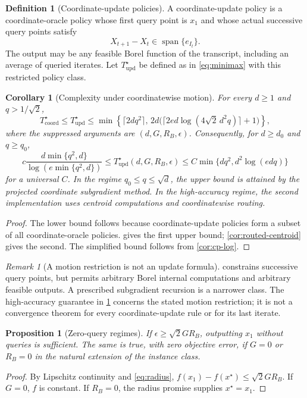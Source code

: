 \documentclass[11pt]{article}
\numberwithin{equation}{section}
\newtheorem{proposition}[proposition]{Proposition}
\newtheorem{corollary}[corollary]{Corollary}
\theoremstyle{definition}
\newtheorem{definition}[definition]{Definition}
\theoremstyle{remark}
\newtheorem{remark}[remark]{Remark}
\newcommand{\Tcoord}{T_{\mathrm{coord}}^\star}
\newcommand{\Tupd}{T_{\mathrm{upd}}^\star}
\newcommand{\eps}{\epsilon}
\begin{document}
\begin{definition}[Coordinate-update policies]\label{def:update}
A coordinate-update policy is a coordinate-oracle policy whose first query point is $x_1$ and whose actual successive query points satisfy
\[
X_{t+1}-X_t\in\operatorname{span}\{e_{I_t}\}.
\]
The output may be any feasible Borel function of the transcript, including an average of queried iterates. Let $\Tupd$ be defined as in \eqref{eq:minimax} with this restricted policy class.
\end{definition}

\begin{corollary}[Complexity under coordinatewise motion]\label{cor:update}
For every $d\ge1$ and $q>1/\sqrt2$,
\begin{equation}\label{eq:update-upper}
\Tcoord\le\Tupd\le
\min\left\{\lceil2dq^2\rceil,\,
2d\bigl(\lceil2ed\log(4\sqrt2\,d^2q)\rceil+1\bigr)\right\},
\end{equation}
where the suppressed arguments are $(d,G,R_B,\eps)$. Consequently, for $d\ge d_0$ and $q\ge q_0$,
\begin{equation}\label{eq:update-frontier}
c\frac{d\min\{q^2,d\}}{\log(e\min\{q^2,d\})}
\le \Tupd(d,G,R_B,\eps)
\le C\min\{dq^2,d^2\log(edq)\}
\end{equation}
for a universal $C$. In the regime $q_0\le q\le\sqrt d$, the upper bound is attained by the projected coordinate subgradient method. In the high-accuracy regime, the second implementation uses centroid computations and coordinatewise routing.
\end{corollary}
\begin{proof}
The lower bound follows because coordinate-update policies form a subset of all coordinate-oracle policies.  gives the first upper bound; \cref{cor:routed-centroid} gives the second. The simplified bound follows from \cref{cor:cp-log}.
\end{proof}

\begin{remark}[A motion restriction is not an update formula]
 constrains successive query points, but permits arbitrary Borel internal computations and arbitrary feasible outputs. A prescribed subgradient recursion is a narrower class. The high-accuracy guarantee in \cref{cor:update} concerns the stated motion restriction; it is not a convergence theorem for every coordinate-update rule or for its last iterate.
\end{remark}

\begin{proposition}[Zero-query regimes]\label{prop:zero}
If $\eps\ge\sqrt2GR_B$, outputting $x_1$ without queries is sufficient. The same is true, with zero objective error, if $G=0$ or $R_B=0$ in the natural extension of the instance class.
\end{proposition}
\begin{proof}
By Lipschitz continuity and \eqref{eq:radius}, $f(x_1)-f(x^\star)\le\sqrt2GR_B$. If $G=0$, $f$ is constant. If $R_B=0$, the radius promise supplies $x^\star=x_1$.
\end{proof}
\end{document}
